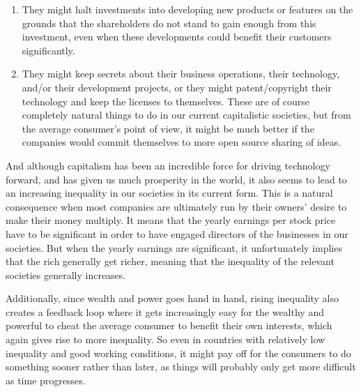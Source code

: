 \documentclass{article}
\begin{document}
\begin{enumerate}
	\item They might halt investments into developing new products or features on the grounds that the shareholders do not stand to gain enough from this investment, even when these developments could benefit their customers significantly. 

	\item They might keep secrets about their business operations, their technology, and/or their development projects, or they might patent/copyright their technology and keep the licenses to themselves. These are of course completely natural things to do in our current capitalistic societies, but from the average consumer's point of view, it might be much better if the companies would commit themselves to more open source sharing of ideas.
\end{enumerate}
%


And although capitalism has been an incredible force for driving technology forward, and has given us much prosperity in the world, it also seems to lead to an increasing inequality in our societies in its current form. This is a natural consequence when most companies are ultimately run by their owners' desire to make their money multiply. 
It means that the yearly earnings per stock price have to be significant in order to have engaged directors of the businesses in our societies. %
But when the yearly earnings are significant, it unfortunately implies that the rich generally get richer, %
meaning that the inequality of the relevant societies generally increases. 

Additionally, since wealth and power goes hand in hand, rising inequality also creates a feedback loop where it gets increasingly easy for the wealthy and powerful to cheat the average consumer to benefit their own interests, which again gives rise to more inequality. 
So even in countries with relatively low inequality and good working conditions, it might pay off for the consumers to do something sooner rather than later, as things will probably only get more difficult as time progresses.
\end{document}
